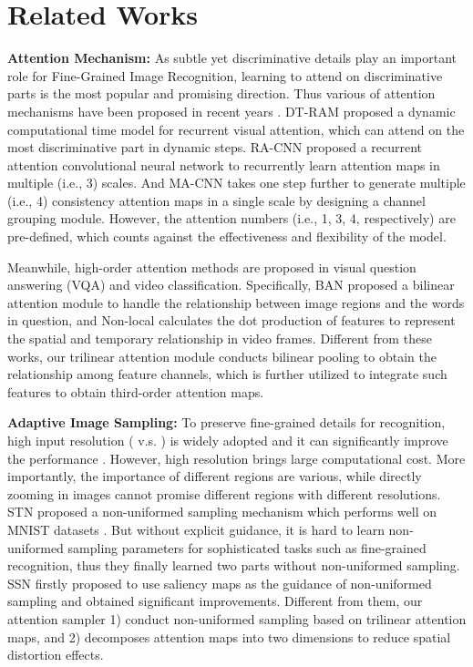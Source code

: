 \documentclass[10pt,twocolumn,letterpaper]{article}
\begin{document}
\section{Related Works}
\label{rw}


\textbf{Attention Mechanism:}
As subtle yet discriminative details play an important role for Fine-Grained Image Recognition, learning to attend on discriminative parts is the most popular and promising direction. Thus various of attention mechanisms have been proposed in recent years \cite{Fu_2017_CVPR,li2017dynamic,sun2018multi,two-attention,Zheng_2017_ICCV}. DT-RAM \cite{li2017dynamic} proposed a dynamic computational time model for recurrent visual attention, which can attend on the most discriminative part in dynamic steps. RA-CNN \cite{Fu_2017_CVPR} proposed a recurrent attention convolutional neural network to recurrently learn attention maps in multiple (i.e., 3) scales. And MA-CNN \cite{Zheng_2017_ICCV} takes one step further to generate multiple (i.e., 4) consistency attention maps in a single scale by designing a channel grouping module. However, the attention numbers (i.e., 1, 3, 4, respectively) are pre-defined, which counts against the effectiveness and flexibility of the model.


Meanwhile, high-order attention methods are proposed in visual question answering (VQA) and video classification. Specifically, BAN \cite{kim2018bilinear} proposed a bilinear attention module to handle the relationship between image regions and the words in question, and Non-local \cite{wang2018non} calculates the dot production of features to represent the spatial and temporary relationship in video frames. Different from these works, our trilinear attention module conducts bilinear pooling to obtain the relationship among feature channels, which is further utilized to integrate such features to obtain third-order attention maps.



\textbf{Adaptive Image Sampling:}
To preserve fine-grained details for recognition, high input resolution ( v.s. ) is widely adopted \cite{cui2018large,DBLP:journals/corr/WeiXW16,Zheng_2017_ICCV} and it can significantly improve the performance \cite{cui2018large}. However, high resolution brings large computational cost. More importantly, the importance of different regions are various, while directly zooming in images cannot promise different regions with different resolutions. STN \cite{SpatialTrans} proposed a non-uniformed sampling mechanism which performs well on MNIST datasets \cite{lecun1998gradient}. But without explicit guidance, it is hard to learn non-uniformed sampling parameters for sophisticated tasks such as fine-grained recognition, thus they finally learned two parts without non-uniformed sampling. SSN \cite{recasens2018learning} firstly proposed to use saliency maps as the guidance of non-uniformed sampling and obtained significant improvements. Different from them, our attention sampler 1) conduct non-uniformed sampling based on trilinear attention maps, and 2) decomposes attention maps into two dimensions to reduce spatial distortion effects.
\end{document}
